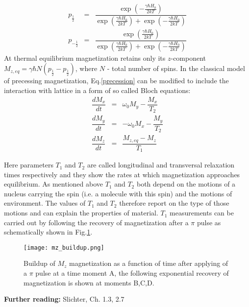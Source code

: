 \documentclass[a4paper, 12pt]{article}
\begin{document}
\begin{equation}
\begin{array} {lcl} \label{eq:populations}
p_{\frac{1}{2}} &=& \dfrac{\exp{ (-\frac{\gamma \hbar H_0}{2kT}) }}{\exp{ (\frac{\gamma \hbar H_0}{2kT}) }+\exp{ (-\frac{\gamma \hbar H_0}{2kT} )}} \\
p_{-\frac{1}{2}} &=& \dfrac{\exp{ (\frac{\gamma \hbar H_0}{2kT}) }}{\exp{ (\frac{\gamma \hbar H_0}{2kT}) }+\exp{ (-\frac{\gamma \hbar H_0}{2kT} )}}
\end{array}
\end{equation}
 At thermal equilibrium magnetization retains only its $z$-component $M_{z,eq} = \gamma \hbar N (p_{\frac{1}{2}} - p_{\frac{1}{2}}) $, where $N$ - total number of spins. In the classical model of precessing magnetization, Eq.\ref{precession} can be modified to include the interaction with lattice in a form of so called Bloch equations:
\begin{equation}
\begin{array}{lcl}
\dfrac{dM_x}{dt} & = & \omega_0 M_y - \dfrac{M_x}{T_2}  \\
\dfrac{dM_y}{dt} & = & -\omega_0 M_x - \dfrac{M_y}{T_2} \\
\dfrac{dM_z}{dt} & = & \dfrac{M_{z,eq}-M_z}{T_1} 
\end{array}
\end{equation} 

Here parameters $T_1$ and $T_2$ are called longitudinal and transversal relaxation times respectively and they show the rates at which magnetization approaches equilibrium. As mentioned above $T_1$ and $T_2$ both depend on the motions of a nucleus carrying the spin (i.e. a molecule with this spin) and the motions of environment. The values of $T_1$ and $T_2$ therefore report on the type of those motions and can explain the properties of material. 
$T_1$ measurements can be carried out by following the recovery of magnetization after a $\pi$ pulse as schematically shown in Fig.\ref{fig:mz_buildup}. 

\begin{figure}[ht]
\caption{Buildup of $M_z$ magnetization as a function of time after applying of a $\pi$ pulse at a time moment A, the following exponential recovery of magnetization is shown at moments B,C,D.}
\label{fig:mz_buildup}
\centering
\texttt{[image: mz\_buildup.png]}
\end{figure}

\textbf{Further reading:} Slichter, Ch. 1.3, 2.7
\end{document}
